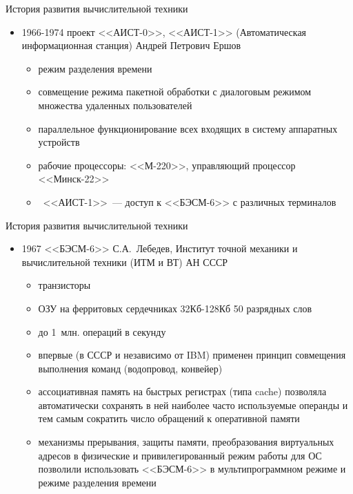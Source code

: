 \documentclass[aspectratio=169,14pt]{beamer}
\begin{document}
\begin{frame}{История развития вычислительной техники}
    \begin{itemize}
        \item 1966-1974 проект <<АИСТ-0>>, <<АИСТ-1>> (Автоматическая информационная
        станция) Андрей Петрович Ершов
        \begin{itemize}
            \item режим разделения времени
            \item совмещение режима пакетной обработки с
            диалоговым режимом множества удаленных пользователей
            \item параллельное функционирование всех входящих в систему аппаратных устройств
            \item рабочие процессоры: <<М-220>>, управляющий процессор <<Минск-22>>
            \item ~<<АИСТ-1>>~--- доступ к <<БЭСМ-6>> с различных терминалов
        \end{itemize}
    \end{itemize}
\end{frame}

\begin{frame}{История развития вычислительной техники}
    \begin{itemize}
        \item 1967 <<БЭСМ-6>> С.А.~Лебедев, Институт точной механики и вычислительной
        техники (ИТМ и ВТ) АН СССР
        \begin{itemize}
            \item транзисторы
            \item ОЗУ на ферритовых сердечниках 32Кб-128Кб 50 разрядных слов
            \item до 1~млн. операций в секунду
            \item впервые (в СССР и независимо от IBM) применен принцип
            совмещения выполнения команд (водопровод, конвейер)
            \item ассоциативная память на быстрых регистрах (типа cache) позволяла
            автоматически сохранять в ней наиболее часто используемые операнды и тем самым сократить число обращений к оперативной памяти
            \item \begin{spacing}{0.9}механизмы прерывания, защиты памяти, преобразования виртуальных
            адресов в физические и привилегированный режим работы для ОС
            позволили использовать <<БЭСМ-6>> в мультипрограммном режиме и режиме разделения времени
            \end{spacing}
        \end{itemize}
    \end{itemize}
\end{frame}
\end{document}
